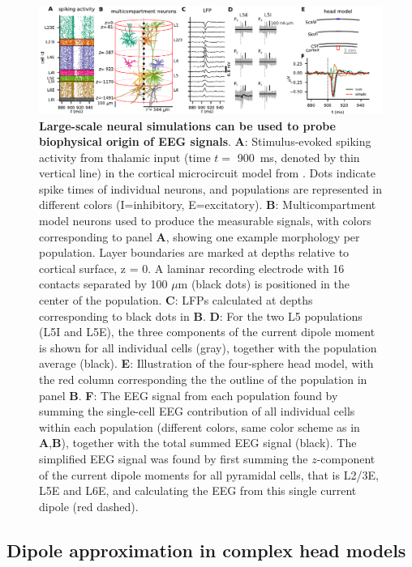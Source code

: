 \documentclass[preprint,10pt,authoryear]{elsarticle}
\newcommand{\gex}[1]{{\color{Orange}#1}}
\begin{document}
\begin{figure}[H]
	\centering
	\includegraphics[width=1.0\textwidth]{hybrid_with_EEG}
	\caption{\textbf{Large-scale neural simulations can be used to probe biophysical origin of EEG signals}. 
		\textbf{A}: Stimulus-evoked spiking activity from thalamic input (time $t= $ 900~ms, denoted by thin vertical line) in the cortical microcircuit model from \cite{POTJANS2014}. Dots indicate spike times of individual neurons, and populations are represented in different colors (I=inhibitory, E=excitatory).
		\textbf{B}: Multicompartment model neurons used to produce the measurable signals, with colors corresponding to panel \textbf{A}, showing one example morphology per population. Layer boundaries are marked at depths relative to cortical surface, z = 0. A laminar recording electrode with 16 contacts separated by
		100 $\mu$m (black dots) is positioned in the center of the population.
		\textbf{C}: LFPs calculated at depths corresponding to black dots in \textbf{B}.
		\textbf{D}: For the two L5 populations (L5I and L5E), the three components of the current dipole moment is shown for all individual cells (gray), together with the population average (black).
		\textbf{E}: Illustration of the four-sphere head model, with the red column corresponding the the outline of the population in panel \textbf{B}.
		\textbf{F}: The EEG signal from each population found by summing the single-cell EEG contribution of all individual cells \gex{within each population} (different colors, \gex{same color scheme as in \textbf{A},\textbf{B}}), together with the total summed EEG signal (black). The simplified EEG signal was found by first summing the \gex{$z$}-component of the current dipole moments for all pyramidal cells, that is L2/3E, L5E and L6E, and calculating the EEG from this single current dipole (red dashed).
	}
	\label{fig:population}
\end{figure}


\subsection{Dipole approximation in complex head models}
\end{document}
